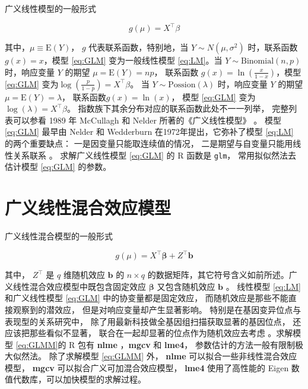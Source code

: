 \documentclass[12pt,a4paper,UTF8,twoside]{book}
\theoremstyle{definition}
\theoremstyle{definition}
\theoremstyle{definition}
\theoremstyle{remark}
\begin{document}
广义线性模型的一般形式

\begin{equation}
g(\mu) = X^{\top}\beta  \label{eq:GLM}
\end{equation}

\noindent 其中，\(\mu \equiv \mathrm{E}(Y)\)， \(g\)
代表联系函数，特别地，当 \(Y \sim N(\mu,\sigma^2)\) 时，联系函数
\(g(x) = x\)，模型 \eqref{eq:GLM} 变为一般线性模型 \eqref{eq:LM}。当
\(Y \sim \mathrm{Binomial}(n,p)\) 时，响应变量 \(Y\) 的期望
\(\mu =\mathrm{E}(Y) = np\)， 联系函数 \(g(x)=\ln(\frac{x}{1-x})\)，模型
\eqref{eq:GLM} 变为\(\log(\frac{p}{1-p})=X^{\top}\beta\)。 当
\(Y \sim \mathrm{Possion}(\lambda)\) 时，响应变量 \(Y\) 的期望
\(\mu =\mathrm{E}(Y) = \lambda\)， 联系函数\(g(x) = \ln(x)\)， 模型
\eqref{eq:GLM} 变为 \(\log(\lambda) = X^{\top}\beta\)。
指数族下其余分布对应的联系函数此处不一一列举， 完整列表可以参看 1989 年
McCullagh 和 Nelder 所著的《广义线性模型》 \citep{McCullagh1989}。 模型
\eqref{eq:GLM} 最早由 Nelder 和 Wedderburn
在1972年提出\citep{Nelder1972}，它弥补了模型 \eqref{eq:LM}
的两个重要缺点： 一是因变量只能取连续值的情况，
二是期望与自变量只能用线性关系联系 \citep{Chen2011}。 求解广义线性模型
\eqref{eq:GLM} 的 R 函数是 \texttt{glm}， 常用拟似然法去估计模型
\eqref{eq:GLM} 的参数。

\hypertarget{Generalized-Linear-Mixed-Effects-Models}{%
\section{广义线性混合效应模型}\label{Generalized-Linear-Mixed-Effects-Models}}

广义线性混合模型的一般形式

\begin{equation}
g(\mu) = X^{\top}\boldsymbol{\beta} + Z^{\top}\mathbf{b}  \label{eq:GLMM}
\end{equation}

\noindent 其中， \(Z^{\top}\) 是 \(q\) 维随机效应 \(\mathbf{b}\) 的
\(n \times q\)
的数据矩阵，其它符号含义如前所述。广义线性混合效应模型中既包含固定效应
\(\boldsymbol{\beta}\) 又包含随机效应 \(\mathbf{b}\) 。 线性模型
\eqref{eq:LM} 和广义线性模型 \eqref{eq:GLM} 中的协变量都是固定效应，
而随机效应是那些不能直接观察到的潜效应， 但是对响应变量却产生显著影响。
特别是在基因变异位点与表现型的关系研究中，
除了用最新科技做全基因组扫描获取显著的基因位点，
还应该把那些看似不显著， 联合在一起却显著的位点作为随机效应去考虑
\citep{Yang2010Common}。求解模型 \eqref{eq:GLMM}的 R 包有 \textbf{nlme}
，\textbf{mgcv} 和 \textbf{lme4}， 参数估计的方法一般有限制极大似然法。
除了求解模型 \eqref{eq:GLMM} 外， \textbf{nlme}
可以拟合一些非线性混合效应模型， \textbf{mgcv}
可以拟合广义可加混合效应模型， \textbf{lme4} 使用了高性能的 Eigen
数值代数库，可以加快模型的求解过程。
\end{document}
